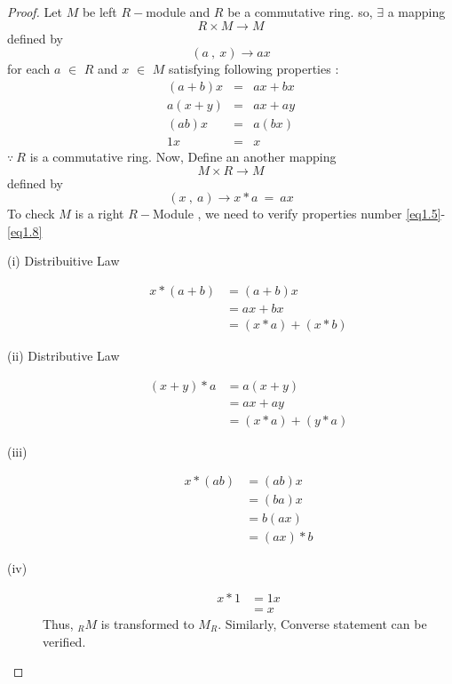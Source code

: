 \begin{proof} Let $M$ be left $R-$module and $R$ be a commutative ring. \newline
	so, $\exists$ a mapping
\begin{equation*}
R \times M \rightarrow M
\end{equation*}	
defined by
\begin{equation*}
(a \ , \ x) \rightarrow ax
\end{equation*}
for each $a$ $\in$ $R$ and $x$ $\in$ $M$ satisfying following properties :
\begin{eqnarray*}
(a+b) x &=& ax + bx \\ a(x+y) &=& ax + ay \\ (ab)x &=& a(bx) \\ 1x &=& x
\end{eqnarray*}
$\because \ R$ is a commutative ring.\newline
Now, Define an another mapping
 \begin{equation*}
 M \times R \rightarrow M
 \end{equation*}	
 defined by
 \begin{equation*}
 (x \ ,\ a) \rightarrow x*a \ = \ ax
 \end{equation*}
To check $M$ is a right $R-$Module , we need to verify properties number \ref{eq1.5}-\eqref{eq1.8}
 \begin{description}
 	\item[(i) Distribuitive Law]
 	\begin{align*}
 		x*(a+b) &= (a+b)x \\ &= ax + bx \\ &= (x*a) + (x*b)
 	\end{align*}
 	\item[(ii) Distributive Law] \begin{align*}
 		(x+y)*a &= a(x+y) \\ &= ax + ay \\ &= (x*a) + (y*a)
 	      \end{align*}
       \item[(iii)]  \begin{align*}
       x*(ab) &= (ab)x \\ &= (ba)x \\ &= b(ax) \\ &= (ax)*b
       \end{align*}
   \item[(iv)] \begin{align*}
   x*1 &= 1x \\  &= x
   \end{align*}
Thus, $_{R}M$ is transformed to $M_R$.\newline
Similarly, Converse statement can be verified.
\end{description}
\end{proof} \bigskip
